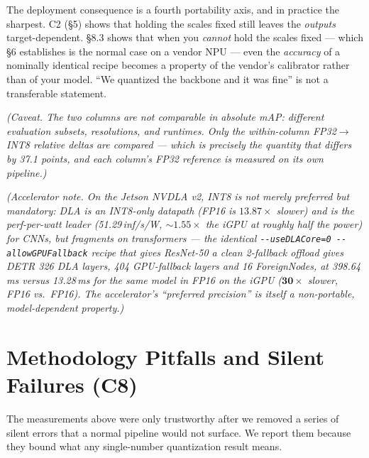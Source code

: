 \documentclass[11pt]{article}
\begin{document}
The deployment consequence is a fourth portability axis, and in practice the sharpest. C2 (\S5) shows that holding the scales fixed still leaves the \emph{outputs} target-dependent. \S8.3 shows that when you \emph{cannot} hold the scales fixed --- which \S6 establishes is the normal case on a vendor NPU --- even the \emph{accuracy} of a nominally identical recipe becomes a property of the vendor's calibrator rather than of your model. ``We quantized the backbone and it was fine'' is not a transferable statement.

\emph{(Caveat. The two columns are not comparable in absolute mAP: different evaluation subsets, resolutions, and runtimes. Only the within-column FP32$\rightarrow$INT8 relative deltas are compared --- which is precisely the quantity that differs by 37.1 points, and each column's FP32 reference is measured on its own pipeline.)}

\emph{(Accelerator note. On the Jetson NVDLA v2, INT8 is not merely preferred but mandatory: DLA is an INT8-only datapath (FP16 is $13.87\times$ slower) and is the perf-per-watt leader (51.29\,inf/s/W, ${\sim}1.55\times$ the iGPU at roughly half the power) for CNNs, but fragments on transformers --- the identical \texttt{-{}-useDLACore=0 -{}-allowGPUFallback} recipe that gives ResNet-50 a clean 2-fallback offload gives DETR 326 DLA layers, 404 GPU-fallback layers and 16 ForeignNodes, at 398.64\,ms versus 13.28\,ms for the same model in FP16 on the iGPU ($\mathbf{30\times}$ slower, FP16 vs.\ FP16). The accelerator's ``preferred precision'' is itself a non-portable, model-dependent property.)}

\section{Methodology Pitfalls and Silent Failures (C8)}

The measurements above were only trustworthy after we removed a series of silent errors that a normal pipeline would not surface. We report them because they bound what any single-number quantization result means.
\end{document}

